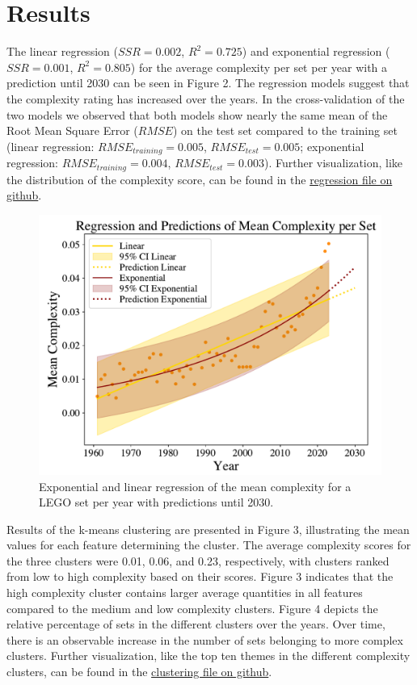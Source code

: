 \documentclass{article}
\theoremstyle{plain}
\theoremstyle{definition}
\theoremstyle{remark}
\begin{document}
	\section{Results}\label{sec:results}
	The linear regression ($SSR = 0.002$, $R^2= 0.725$) and exponential regression ($SSR = 0.001$, $R^2= 0.805$) for the average complexity per set per year with a prediction until 2030 can be seen in Figure 2. The regression models suggest that the complexity rating has increased over the years. In the cross-validation of the two models we observed that both models show nearly the same mean of the Root Mean Square Error ($RMSE$) on the test set compared to the training set (linear regression: $RMSE_{training} = 0.005$, $RMSE_{test} = 0.005$; exponential regression: $RMSE_{training} = 0.004$, $RMSE_{test} = 0.003$). Further visualization, like the distribution of the complexity score, can be found in the \href{https://github.com/eddiebeach99/Data_Literacy/blob/main/Analysis/complexity_regression.ipynb}{regression file on github}.\\
	\begin{figure}[H]
		\vskip 0.2in
		\begin{center}
			\centerline{\includegraphics[width=\columnwidth]{../Images/Regressions.pdf}}
			\caption{Exponential and linear regression of the mean complexity for a LEGO set per year with predictions until 2030.}
			\label{icml-historical}
		\end{center}
		\vskip -0.2in
	\end{figure}
	Results of the k-means clustering are presented in Figure 3, illustrating the mean values for each feature determining the cluster. The average complexity scores for the three clusters were 0.01, 0.06, and 0.23, respectively, with clusters ranked from low to high complexity based on their scores. Figure 3 indicates that the high complexity cluster contains larger average quantities in all features compared to the medium and low complexity clusters. Figure 4 depicts the relative percentage of sets in the different clusters over the years. Over time, there is an observable increase in the number of sets belonging to more complex clusters. Further visualization, like the top ten themes in the different complexity clusters, can be found in the \href{https://github.com/eddiebeach99/Data_Literacy/blob/main/Analysis/clustering.ipynb}{clustering file on github}.
\end{document}
